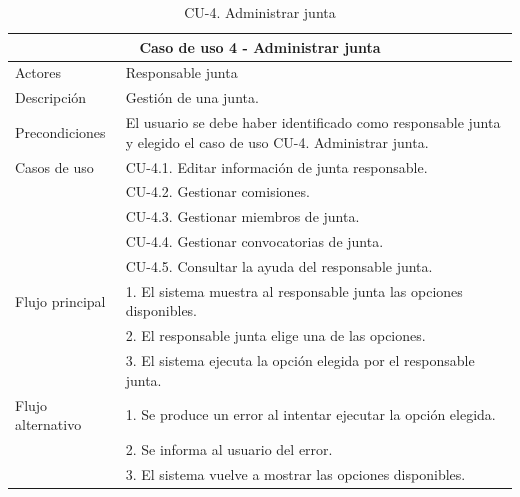 \begin{table}[H]
        \caption{CU-4. Administrar junta}
        \label{tab:CU-4}
        \begin{center}
            \begin{tabular}{|l|p{12cm}|}
                \hline
                \multicolumn{2}{|c|}{Caso de uso 4 - Administrar junta} \\ \hline \hline
                Actores                 &   Responsable junta         \\  \hline
                Descripción             &   Gestión de una junta. \\  \hline
                Precondiciones          &   El usuario se debe haber identificado como responsable junta y elegido el caso de uso CU-4. Administrar junta.  \\  \hline
                Casos de uso            &  CU-4.1. Editar información de junta responsable. \\ 
                &
                CU-4.2. Gestionar comisiones. \\ 
                &
                CU-4.3. Gestionar miembros de junta. \\ 
                &
                CU-4.4. Gestionar convocatorias de junta. \\ 
                & 
                CU-4.5. Consultar la ayuda del responsable junta. \\ 
                \hline
                Flujo principal     &    1. El sistema muestra al responsable junta las opciones disponibles.\\ 
                &   2. El responsable junta elige una de las opciones.\\ 
                &   3. El sistema ejecuta la opción elegida por el responsable junta.\\ 
                \hline
                Flujo alternativo    &  1. Se produce un error al intentar ejecutar la opción elegida. \\ 
                &  2. Se informa al usuario del error.  \\  
                &  3. El sistema vuelve a mostrar las opciones disponibles.  \\
                \hline
            \end{tabular}
        \end{center}
    \end{table}

